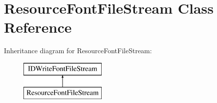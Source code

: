 \hypertarget{class_resource_font_file_stream}{\section{Resource\-Font\-File\-Stream Class Reference}
\label{class_resource_font_file_stream}
}
Inheritance diagram for Resource\-Font\-File\-Stream\-:\begin{figure}[H]
\begin{center}
\leavevmode
\includegraphics[height=2.000000cm]{class_resource_font_file_stream}
\end{center}
\end{figure}
